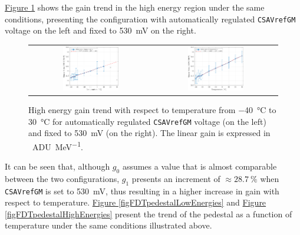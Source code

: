 \par
\hyperref[figFDTgainHighEnergies]{Figure \ref{figFDTgainHighEnergies}} shows the gain trend in the high energy region under the same conditions, presenting the configuration with automatically regulated \texttt{CSAVrefGM} voltage on the left and fixed to \SI{530}{\milli\volt} on the right.

\begin{figure}[h!]
    \centering
    \begin{tabular}{cc}
        \includegraphics[width=0.475\textwidth]{Images/chap1/results/gain_pedestal/high_energy_gain_auto_0011.pdf} & \includegraphics[width=0.475\textwidth]{Images/chap1/results/gain_pedestal/high_energy_gain_530mV.pdf}\\
    \end{tabular}
    \caption{High energy gain trend with respect to temperature from \SI{-40}{\celsius} to \SI{30}{\celsius} for automatically regulated \texttt{CSAVrefGM} voltage (on the left) and fixed to \SI{530}{\milli\volt} (on the right). The linear gain is expressed in \SI{}{ADU\per\mega\electronvolt}.}
    \label{figFDTgainHighEnergies}
\end{figure}

\noindent
It can be seen that, although $g_{0}$ assumes a value that is almost comparable between the two configurations, $g_{1}$ presents an increment of $\approx \SI{28.7}{\percent}$ when \texttt{CSAVrefGM} is set to \SI{530}{\milli\volt}, thus resulting in a higher increase in gain with respect to temperature. \hyperref[figFDTpedestalLowEnergies]{Figure \ref{figFDTpedestalLowEnergies}} and \hyperref[figFDTpedestalHighEnergies]{Figure \ref{figFDTpedestalHighEnergies}} present the trend of the pedestal as a function of temperature under the same conditions illustrated above.

